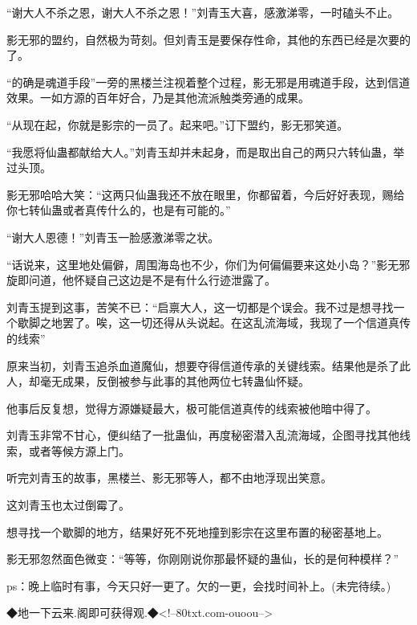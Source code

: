 \begin{this_body}
“谢大人不杀之恩，谢大人不杀之恩！”刘青玉大喜，感激涕零，一时磕头不止。

影无邪的盟约，自然极为苛刻。但刘青玉是要保存性命，其他的东西已经是次要的了。

“的确是魂道手段”一旁的黑楼兰注视着整个过程，影无邪是用魂道手段，达到信道效果。一如方源的百年好合，乃是其他流派触类旁通的成果。

“从现在起，你就是影宗的一员了。起来吧。”订下盟约，影无邪笑道。

“我愿将仙蛊都献给大人。”刘青玉却并未起身，而是取出自己的两只六转仙蛊，举过头顶。

影无邪哈哈大笑：“这两只仙蛊我还不放在眼里，你都留着，今后好好表现，赐给你七转仙蛊或者真传什么的，也是有可能的。”

“谢大人恩德！”刘青玉一脸感激涕零之状。

“话说来，这里地处偏僻，周围海岛也不少，你们为何偏偏要来这处小岛？”影无邪旋即问道，他怀疑自己这边是不是有什么行迹泄露了。

刘青玉提到这事，苦笑不已：“启禀大人，这一切都是个误会。我不过是想寻找一个歇脚之地罢了。唉，这一切还得从头说起。在这乱流海域，我现了一个信道真传的线索”

原来当初，刘青玉追杀血道魔仙，想要夺得信道传承的关键线索。结果他是杀了此人，却毫无成果，反倒被参与此事的其他两位七转蛊仙怀疑。

他事后反复想，觉得方源嫌疑最大，极可能信道真传的线索被他暗中得了。

刘青玉非常不甘心，便纠结了一批蛊仙，再度秘密潜入乱流海域，企图寻找其他线索，或者等候方源上门。

听完刘青玉的故事，黑楼兰、影无邪等人，都不由地浮现出笑意。

这刘青玉也太过倒霉了。

想寻找一个歇脚的地方，结果好死不死地撞到影宗在这里布置的秘密基地上。

影无邪忽然面色微变：“等等，你刚刚说你那最怀疑的蛊仙，长的是何种模样？”

ps：晚上临时有事，今天只好一更了。欠的一更，会找时间补上。(未完待续。)

◆地一下云来.阁即可获得观.◆<!--80txt.com-ouoou-->

\end{this_body}

